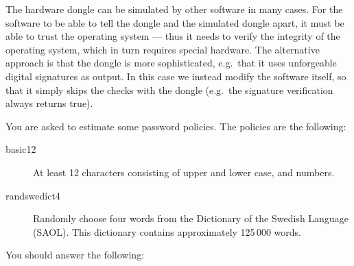 \documentclass[svv,addpoints]{miunexam}
\begin{document}
\begin{questions}
\begin{solution}
  The hardware dongle can be simulated by other software in many cases.
  For the software to be able to tell the dongle and the simulated dongle 
  apart, it must be able to trust the operating system --- thus it needs to 
  verify the integrity of the operating system, which in turn requires special 
  hardware.
  The alternative approach is that the dongle is more sophisticated, e.g.\ that 
  it uses unforgeable digital signatures as output.
  In this case we instead modify the software itself, so that it simply skips 
  the checks with the dongle (e.g.\ the signature verification always returns 
  true).
\end{solution}



\question\label{q:passwd:infotheory:E:C:A}
  You are asked to estimate some password policies.
  The policies are the following:
  \begin{description}
    \item[basic12]
      At least 12 characters consisting of upper and lower case, and numbers.
    \item[randswedict4]
      Randomly choose four words from the Dictionary of the Swedish Language 
      (SAOL).
      This dictionary contains approximately 125\,000 words.
  \end{description}
  You should answer the following:
\end{questions}
\end{document}
